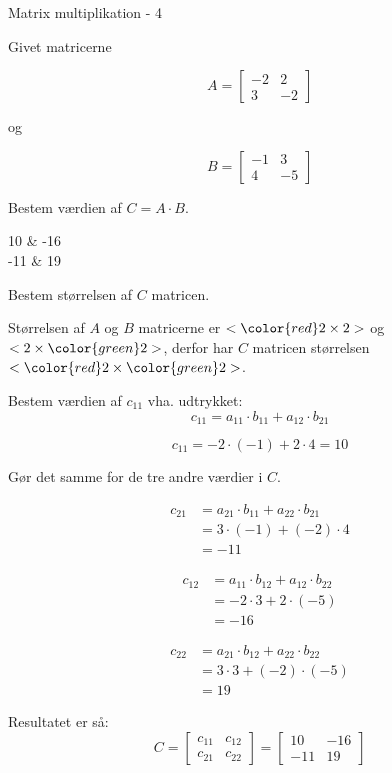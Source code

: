 \documentclass{article}
\begin{document}
\newpage

\begin{exercise}{Matrix multiplikation - 4}
	
	Givet matricerne 
	
	\[
	A = \left[\begin{array}{rr}
	-2 & 2 \\ 
	3 & -2 
	\end{array} \right]
	\]
	
	og 
	
	\[
	B = \left[\begin{array}{rr}
	-1 & 3 \\ 
	4 & -5 
	\end{array} \right]
	\]
	
	Bestem værdien af $C = A \cdot B$.
	
	\begin{answermatrix}
		10 & -16  \\
		-11 & 19 
	\end{answermatrix}
	
	\hint
	Bestem størrelsen af $C$ matricen.
	
	\hint
	Størrelsen af $A$ og $B$ matricerne er $<{\color{red} 2} \times 2>$ og $<2 \times {\color{green}2}>$, 
	derfor har $C$ matricen størrelsen $<{\color{red} 2} \times {\color{green}2}>$.
	
	\hint
	Bestem værdien af $c_{11}$ vha. udtrykket:
	\[
	c_{11} = a_{11} \cdot b_{11} + a_{12} \cdot b_{21}
	\]
	
	\hint
	\[
	c_{11} = -2 \cdot (-1) + 2 \cdot 4 = 10
	\]
	
	\hint
	Gør det samme for de tre andre værdier i $C$.
	
	\hint
	\begin{align*}
		c_{21} & = a_{21} \cdot b_{11} + a_{22} \cdot b_{21} \\
		& = 3 \cdot (-1) + (-2) \cdot 4 \\
		& = -11
	\end{align*}
	
	\hint
	\begin{align*}
		c_{12} & = a_{11} \cdot b_{12} + a_{12} \cdot b_{22} \\
		& = -2 \cdot 3 + 2 \cdot (-5) \\
		& = -16
	\end{align*}
	
	\hint
	\begin{align*}
		c_{22} & = a_{21} \cdot b_{12} + a_{22} \cdot b_{22} \\
		& = 3 \cdot 3 + (-2) \cdot (-5) \\
		& = 19
	\end{align*}
	
	
	\hint
	Resultatet er så:
	\[
	C = \left[\begin{array}{rr}
	c_{11} & c_{12} \\
	c_{21} & c_{22} 
	\end{array} \right] = 
	\left[\begin{array}{rr}
	10 & -16 \\
	-11 & 19 
	\end{array} \right]
	\]
	
	
\end{exercise}
\end{document}
